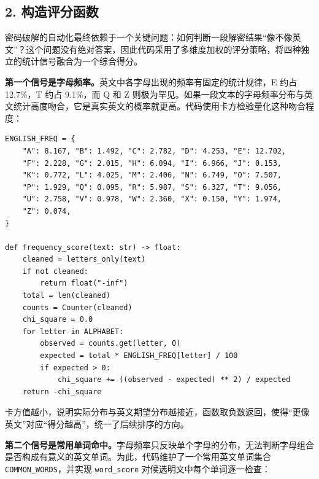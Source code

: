 \documentclass[12pt, a4paper]{article}
\begin{document}
\subsection{2. 构造评分函数}

密码破解的自动化最终依赖于一个关键问题：如何判断一段解密结果``像不像英文''？这个问题没有绝对答案，因此代码采用了多维度加权的评分策略，将四种独立的统计信号融合为一个综合得分。

\textbf{第一个信号是字母频率。}英文中各字母出现的频率有固定的统计规律，E 约占 12.7\%，T 约占 9.1\%，而 Q 和 Z 则极为罕见。如果一段文本的字母频率分布与英文统计高度吻合，它是真实英文的概率就更高。代码使用卡方检验量化这种吻合程度：

\begin{lstlisting}[style=python, caption={英文字母频率表与频率评分函数（common.py）}]
ENGLISH_FREQ = {
    "A": 8.167, "B": 1.492, "C": 2.782, "D": 4.253, "E": 12.702,
    "F": 2.228, "G": 2.015, "H": 6.094, "I": 6.966, "J": 0.153,
    "K": 0.772, "L": 4.025, "M": 2.406, "N": 6.749, "O": 7.507,
    "P": 1.929, "Q": 0.095, "R": 5.987, "S": 6.327, "T": 9.056,
    "U": 2.758, "V": 0.978, "W": 2.360, "X": 0.150, "Y": 1.974,
    "Z": 0.074,
}

def frequency_score(text: str) -> float:
    cleaned = letters_only(text)
    if not cleaned:
        return float("-inf")
    total = len(cleaned)
    counts = Counter(cleaned)
    chi_square = 0.0
    for letter in ALPHABET:
        observed = counts.get(letter, 0)
        expected = total * ENGLISH_FREQ[letter] / 100
        if expected > 0:
            chi_square += ((observed - expected) ** 2) / expected
    return -chi_square
\end{lstlisting}

卡方值越小，说明实际分布与英文期望分布越接近，函数取负数返回，使得``更像英文''对应``得分越高''，统一了后续排序的方向。

\textbf{第二个信号是常用单词命中。}字母频率只反映单个字母的分布，无法判断字母组合是否构成有意义的英文单词。为此，代码维护了一个常用英文单词集合 \texttt{COMMON\_WORDS}，并实现 \texttt{word\_score} 对候选明文中每个单词逐一检查：
\end{document}
